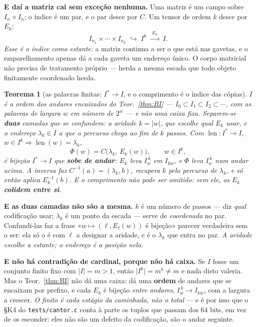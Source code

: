 \documentclass[11pt,a4paper]{article}
\newcommand{\code}[1]{\texttt{\small #1}}
\newtheorem{teorema}{Teorema}
\begin{document}
\medskip\noindent\textbf{E daí a matriz cai sem exceção nenhuma.} Uma matriz é um
campo sobre $I_n\times I_n$; o índice é um par, e o par desce por $C$. Um tensor de
ordem $k$ desce por $E_k$:
\[
I_{n_1}\times\cdots\times I_{n_k}\;\hookrightarrow\;I^{k}
\;\xrightarrow{\;E_k\;}\;I .
\]
\emph{Esse é o índice como estante:} a matriz continua a ser o que está nas gavetas,
e o emparelhamento apenas dá a cada gaveta um endereço único. O corpo matricial não
precisa de tratamento próprio --- herda a mesma escada que todo objeto finitamente
coordenado herda.

\begin{teorema}[as palavras finitas: $I^{*}\to I$, e o comprimento é o índice das cópias]\label{thm:palavras}
\emph{$I$ é a ordem dos andares encaixados do Teor.~\ref{thm:BI}} --- $I_0\subset
I_1\subset I_2\subset\cdots$, com as palavras de largura $w$ em número de $2^{w}$ ---
e não uma caixa fixa. Separem-se \textbf{duas} camadas que se confundem: a
\emph{aridade} $k=\lvert w\rvert$, que escolhe qual $E_k$ usar, e o \emph{endereço}
$\lambda_k\in I$ a que o percurso chega ao fim de $k$ passos. Com
$\operatorname{len}\colon I^{*}\to I$, $w\in I^{k}\Rightarrow\operatorname{len}(w)=\lambda_k$,
\[
\Phi(w)=C\bigl(\lambda_k,\,E_k(w)\bigr),\qquad w\in I^{k},
\]
é bijeção $I^{*}\to I$ que \textbf{sobe de andar}: $E_k$ leva $I_w^{\,k}$ em
$I_{kw}$, e $\Phi$ leva $I_w^{\,k}$ num andar acima. A inversa faz
$C^{-1}(a)=(\lambda_k,b)$, recupera $k$ pelo \emph{percurso} de $\lambda_k$, e só
então aplica $E_k^{-1}(b)$. E o comprimento não pode ser omitido: sem ele, os $E_k$
\textbf{colidem entre si}.
\end{teorema}

\noindent\textbf{E as duas camadas não são a mesma.} $k$ é um número de passos ---
diz \emph{qual} codificação usar; $\lambda_k$ é um ponto da escada --- serve de
\emph{coordenada} no par. Confundi-las faz a frase «$w\mapsto(\ell,E_\ell(w))$ é
bijeção» parecer verdadeira sem o ser: ela só o é com $\ell$ a designar a aridade, e
é o $\lambda_k$ que entra no par. \emph{A aridade escolhe a estante; o endereço é a
posição nela.}

\noindent\textbf{E não há contradição de cardinal, porque não há caixa.} Se $I$ fosse
um conjunto finito fixo com $\lvert I\rvert=m>1$, então $\lvert I^{k}\rvert=m^{k}\neq m$
e nada disto valeria. Mas o Teor.~\ref{thm:BI} não dá uma caixa: dá uma
\textbf{ordem} de andares que se encaixam por prefixo, e cada $E_k$ é bijeção
\emph{entre andares}, $I_w^{\,k}\to I_{kw}$, com a largura a crescer. \emph{O finito é
cada estágio da caminhada, não o total} --- e é por isso que o §K4 do
\code{tests/cantor.c} conta à parte os tuplos que passam dos $64$ bits, em vez de os
esconder: eles não são um defeito da codificação, são o andar seguinte.
\end{document}
